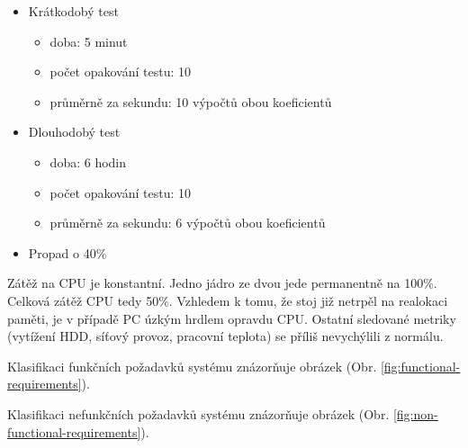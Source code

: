 \begin{itemize}
	\setlength{\parskip}{0pt}
	\setlength{\itemsep}{0pt}
	\item {Krátkodobý test}
	\begin{itemize}
		\setlength{\parskip}{0pt}
		\setlength{\itemsep}{0pt}
		\item {doba: 5 minut}
		\item {počet opakování testu: 10}
		\item {průměrně za sekundu: 10 výpočtů obou koeficientů}
	\end{itemize}
	\item {Dlouhodobý test}
	\begin{itemize}
		\setlength{\parskip}{0pt}
		\setlength{\itemsep}{0pt}
		\item {doba: 6 hodin}
		\item {počet opakování testu: 10}
		\item {průměrně za sekundu: 6 výpočtů obou koeficientů}
	\end{itemize}
	\item {Propad o 40\%}
\end{itemize}

Zátěž na CPU je konstantní. Jedno jádro ze dvou jede permanentně na 100\%. Celková zátěž CPU tedy 50\%. Vzhledem k tomu, že stoj již netrpěl na realokaci paměti, je v případě PC úzkým hrdlem opravdu CPU. Ostatní sledované metriky (vytížení HDD, síťový provoz, pracovní teplota) se příliš nevychýlili z normálu.












Klasifikaci funkčních požadavků systému znázorňuje obrázek (Obr. \ref{fig:functional-requirements}).

Klasifikaci nefunkčních požadavků systému znázorňuje obrázek (Obr. \ref{fig:non-functional-requirements}).


